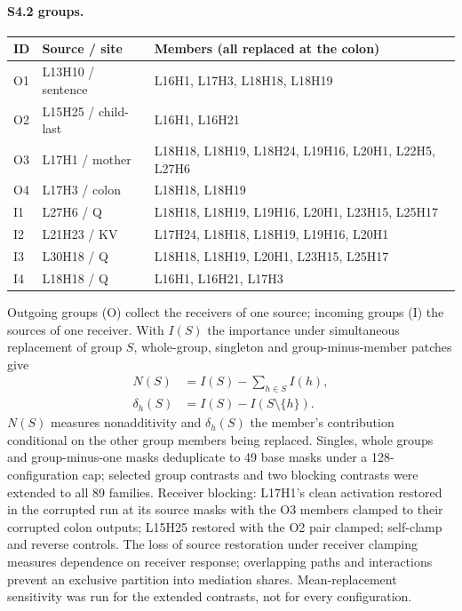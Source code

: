 \paragraph{S4.2 groups.}
\begin{center}\small
\begin{tabular}{@{}llp{5.4cm}@{}}
\toprule
ID & Source / site & Members (all replaced at the colon) \\
\midrule
O1 & L13H10 / sentence & L16H1, L17H3, L18H18, L18H19 \\
O2 & L15H25 / child-last & L16H1, L16H21 \\
O3 & L17H1 / mother & L18H18, L18H19, L18H24, L19H16, L20H1, L22H5, L27H6 \\
O4 & L17H3 / colon & L18H18, L18H19 \\
I1 & L27H6 / Q & L18H18, L18H19, L19H16, L20H1, L23H15, L25H17 \\
I2 & L21H23 / KV & L17H24, L18H18, L18H19, L19H16, L20H1 \\
I3 & L30H18 / Q & L18H18, L18H19, L20H1, L23H15, L25H17 \\
I4 & L18H18 / Q & L16H1, L16H21, L17H3 \\
\bottomrule
\end{tabular}
\end{center}
Outgoing groups (O) collect the receivers of one source; incoming groups (I) the
sources of one receiver. With $I(S)$ the importance under simultaneous replacement
of group $S$, whole-group, singleton and group-minus-member patches give
\begin{align*}
N(S)&=I(S)-\sum_{h\in S}I(h),\\
\delta_h(S)&=I(S)-I(S\setminus\{h\}).
\end{align*}
$N(S)$ measures nonadditivity and $\delta_h(S)$ the member's contribution
conditional on the other group members being replaced. Singles, whole groups and group-minus-one masks
deduplicate to 49 base masks under a 128-configuration cap; selected group
contrasts and two blocking contrasts were extended to all 89 families. Receiver
blocking: L17H1's clean activation restored in the corrupted run at its source
masks with the O3 members clamped to their corrupted colon outputs; L15H25 restored
with the O2 pair clamped; self-clamp and reverse controls. The loss of source
restoration under receiver clamping measures dependence on receiver response;
overlapping paths and interactions prevent an exclusive partition into mediation
shares. Mean-replacement
sensitivity was run for the extended contrasts, not for every configuration.

